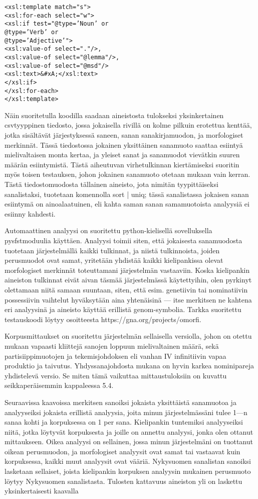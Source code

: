 \documentclass[free]{flammie}
\begin{document}
\begin{verbatim}
<xsl:template match="s">
<xsl:for-each select="w">
<xsl:if test="@type=’Noun’ or
@type=’Verb’ or
@type=’Adjective’">
<xsl:value-of select="."/>,
<xsl:value-of select="@lemma"/>,
<xsl:value-of select="@msd"/>
<xsl:text>&#xA;</xsl:text>
</xsl:if>
</xsl:for-each>
</xsl:template>
\end{verbatim}

Näin suoritetulla koodilla saadaan aineistosta tulokseksi yksinkertainen csvtyyppinen tiedosto, jossa jokaisella rivillä on kolme pilkuin erotettua kenttää, jotka sisältävät järjestyksessä saneen, sanan sanakirjamuodon, ja morfologiset merkinnät. Tässä tiedostossa jokainen yksittäinen sanamuoto saattaa esiintyä mielivaltaisen monta kertaa, ja yleiset sanat ja sanamuodot vievätkin suuren määrän
esiintymistä. Tästä aiheutuvan virhetulkinnan kiertämiseksi suoritin myös toisen
testauksen, johon jokainen sanamuoto otetaan mukaan vain kerran. Tästä tiedostomuodosta tällainen aineisto, jota nimitän tyypittäiseksi sanalistaksi, tuotetaan
komennolla sort | uniq; tässä sanalistassa jokaisen sanan esiintymä on ainoalaatuinen, eli kahta saman sanan samamuotoista analyysiä ei esiinny kahdesti.

Automaattinen analyysi on suoritettu python-kielisellä sovelluksella pysfstmoduulia käyttäen. Analyysi toimii siten, että jokaisesta sanamuodosta tuotetaan
järjestelmällä kaikki tulkinnat, ja niistä tulkinnoista, joiden perusmuodot ovat samat, yritetään yhdistää kaikki kielipankissa olevat morfologiset merkinnät toteuttamani järjestelmän vastaaviin. Koska kielipankin aineiston tulkinnat eivät aivan
täsmää järjestelmässä käytettyihin, olen pyrkinyt olettamaan niitä samaan suuntaan, siten, että esim. genetiivin tai nominatiivin possessiivin vaihtelut hyväksytään aina yhtenäisinä — itse merkitsen ne kahtena eri analyysinä ja aineisto
käyttää erillistä genom-symbolia. Tarkka suoritettu testauskoodi löytyy osoitteesta https://gna.org/projects/omorfi.

Korpusmittaukset on suoritettu järjestelmän sellaisella versiolla, johon on otettu
mukaan vapaasti kliittejä sanojen loppuun mielivaltainen määrä, sekä partisiippimuotojen ja tekemisjohdoksen eli vanhan IV infinitiivin vapaa produktio ja taivutus. Yhdyssanajohdosta mukana on hyvin karkea nominipareja yhdistelevä versio.
Se miten tämä vaikuttaa mittaustuloksiin on kuvattu seikkaperäisemmin kappaleessa 5.4.

Seuraavissa kaavoissa merkitsen sanoiksi jokaista yksittäistä sanamuotoa ja analyyseiksi jokaista erillistä analyysia, joita minun järjestelmässäni tulee 1—n sanaa
kohti ja korpuksessa on 1 per sana. Kielipankin tuntemiksi analyyseiksi niitä, jotka löytyvät korpuksesta ja joille on annettu analyysi, jonka olen ottanut mittaukseen. Oikea analyysi on sellainen, jossa minun järjestelmäni on tuottanut oikean
perusmuodon, ja morfologiset analyysit ovat samat tai vastaavat kuin korpuksessa, kaikki muut analyysit ovat vääriä. Nykysuomen sanalistan sanoiksi lasketaan
sellaiset, joista kielipankin korpuksen analyysin mukainen perusmuoto löytyy Nykysuomen sanalistasta.
Tulosten kattavuus aineiston yli on laskettu yksinkertaisesti kaavalla
\end{document}
